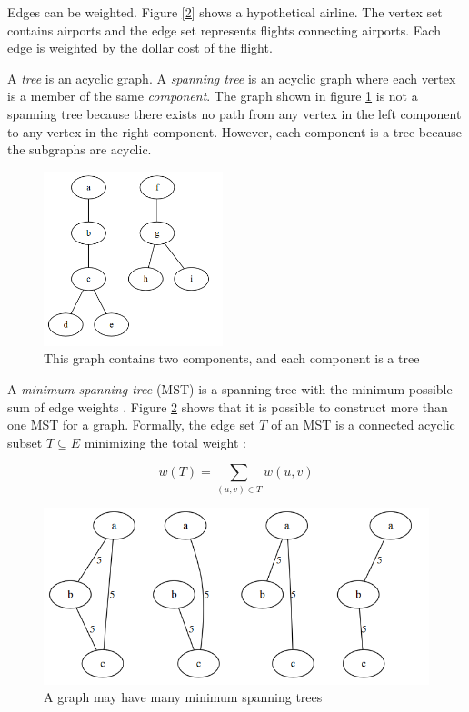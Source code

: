 \documentclass{book}
\begin{document}
Edges can be weighted. Figure \ref{2} shows a hypothetical airline. The vertex set contains airports and the edge set represents flights connecting airports. Each edge is weighted by the dollar cost of the flight.

A \textit{tree} is an acyclic graph. A \textit{spanning tree} is an acyclic graph where each vertex is a member of the same \textit{component}. The graph shown in figure \ref{3} is not a spanning tree because there exists no path from any vertex in the left component to any vertex in the right component. However, each component is a tree because the subgraphs are acyclic.

\begin{figure}[ht]
\centering
\includegraphics[height=2in]{ch-spann/03}
\caption{This graph contains two components, and each component is a tree}
\label{3}
\end{figure}

A \textit{minimum spanning tree} (MST) is a spanning tree with the minimum possible sum of edge weights \cite{rosen2003discrete}. Figure \ref{4} shows that it is possible to construct more than one MST for a graph. Formally, the edge set $T$ of an MST is a connected acyclic subset $T \subseteq E$ minimizing the total weight \cite{cormen2001introduction}:

\begin{equation}
w(T) = \sum_{(u,v) \in T}{w(u,v)}
\end{equation}

\begin{figure}[ht]
\centering
\includegraphics[width=.75\textwidth]{ch-spann/04}
\caption{A graph may have many minimum spanning trees}
\label{4}
\end{figure}
\end{document}

